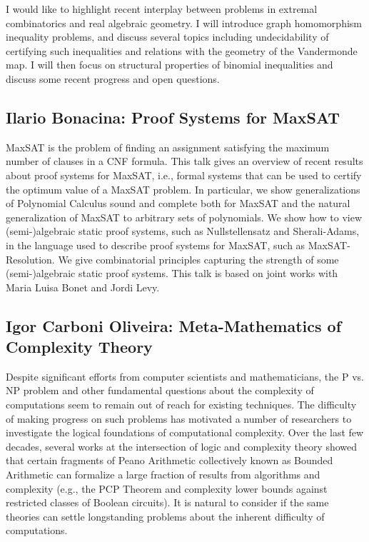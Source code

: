 \documentclass[11pt]{article}
\begin{document}
I would like to highlight recent interplay between problems in extremal combinatorics and real algebraic geometry. I will introduce graph homomorphism inequality problems, and
discuss several topics including undecidability of certifying such inequalities and relations with the geometry of the Vandermonde map. I will then focus on structural properties of binomial inequalities and discuss some recent progress and open questions.

\subsection*{Ilario Bonacina: Proof Systems for MaxSAT}\label{Bonacina}

MaxSAT is the problem of finding an assignment satisfying the maximum number of clauses in a CNF formula. This talk gives an overview of recent results about proof systems for MaxSAT, i.e., formal systems that can be used to certify the optimum value of a MaxSAT problem. In particular, we show generalizations of Polynomial Calculus sound and complete both for MaxSAT and the natural generalization of MaxSAT to arbitrary sets of polynomials. We show how to view (semi-)algebraic static proof systems, such as Nullstellensatz and Sherali-Adams, in the language used to describe proof systems for MaxSAT, such as MaxSAT-Resolution. We give combinatorial principles capturing the strength of some (semi-)algebraic static proof systems. This talk is based on joint works with Maria Luisa Bonet and Jordi Levy.


\subsection*{Igor Carboni Oliveira: Meta-Mathematics of Complexity Theory}\label{Oliveira}

Despite significant efforts from computer scientists and mathematicians, the P vs. NP problem and other fundamental questions about the complexity of computations seem to remain out of reach for existing techniques. The difficulty of making progress on such problems has motivated a number of researchers to investigate the logical foundations of computational complexity. Over the last few decades, several works at the intersection of logic and complexity theory showed that certain fragments of Peano Arithmetic collectively known as Bounded Arithmetic can formalize a large fraction of results from algorithms and complexity (e.g., the PCP Theorem and complexity lower bounds against restricted classes of Boolean circuits). It is natural to consider if the same theories can settle longstanding problems about the inherent difficulty of computations. 
\end{document}
